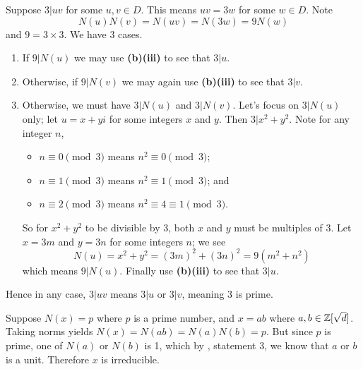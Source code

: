 \begin{questions}
\begin{partquestions}{\alph*}
\begin{partquestions}{\roman*}
            \item Suppose $3 \vert uv$ for some $u,v\in D$. This means $uv = 3w$ for some $w \in D$. Note
            \[
                N(u)N(v) = N(uv) = N(3w) = 9N(w)
            \]
            and $9 = 3\times3$. We have 3 cases.
            \begin{enumerate}[label=\arabic*.]
                \item If $9 \vert N(u)$ we may use \textbf{(b)(iii)} to see that $3 \vert u$.
                \item Otherwise, if $9 \vert N(v)$ we may again use \textbf{(b)(iii)} to see that $3 \vert v$.
                \item Otherwise, we must have $3 \vert N(u)$ and $3 \vert N(v)$. Let's focus on $3 \vert N(u)$ only; let $u = x+yi$ for some integers $x$ and $y$. Then $3 \vert x^2+y^2$. Note for any integer $n$,
                \begin{itemize}
                    \item $n \equiv 0 \pmod3$ means $n^2 \equiv 0 \pmod3$;
                    \item $n \equiv 1 \pmod3$ means $n^2 \equiv 1 \pmod3$; and
                    \item $n \equiv 2 \pmod3$ means $n^2 \equiv 4 \equiv 1 \pmod3$.
                \end{itemize}
                So for $x^2+y^2$ to be divisible by 3, both $x$ and $y$ must be multiples of 3. Let $x = 3m$ and $y = 3n$ for some integers $n$; we see
                \[
                    N(u) = x^2+y^2 = (3m)^2 + (3n)^2 = 9(m^2+n^2)
                \]
                which means $9 \vert N(u)$. Finally use \textbf{(b)(iii)} to see that $3 \vert u$.
            \end{enumerate}
            Hence in any case, $3 \vert uv$ means $3 \vert u$ or $3 \vert v$, meaning 3 is prime.
        \end{partquestions}
    \end{partquestions}

    \item Suppose $N(x) = p$ where $p$ is a prime number, and $x = ab$ where $a,b \in \mathbb{Z}[\sqrt{d}]$. Taking norms yields $N(x) = N(ab) = N(a)N(b) = p$. But since $p$ is prime, one of $N(a)$ or $N(b)$ is 1, which by , statement 3, we know that $a$ or $b$ is a unit. Therefore $x$ is irreducible.


\end{questions}
